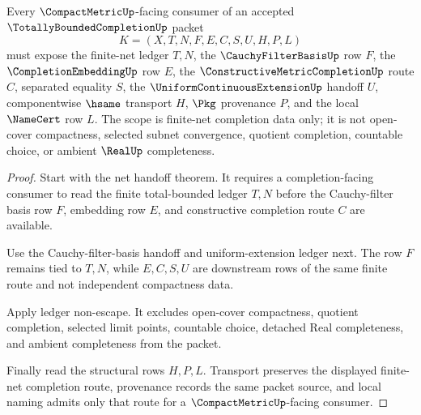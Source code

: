 \begin{theorem}
\label{thm:totally-bounded-completion-compact-metric-scope}
Every $\CompactMetricUp$-facing consumer of an accepted $\TotallyBoundedCompletionUp$ packet
$$
K=(X,T,N,F,E,C,S,U,H,P,L)
$$
must expose the finite-net ledger $T,N$, the $\CauchyFilterBasisUp$ row $F$, the $\CompletionEmbeddingUp$ row $E$, the $\ConstructiveMetricCompletionUp$ route $C$, separated equality $S$, the $\UniformContinuousExtensionUp$ handoff $U$, componentwise $\hsame$ transport $H$, $\Pkg$ provenance $P$, and the local $\NameCert$ row $L$. The scope is finite-net completion data only; it is not open-cover compactness, selected subnet convergence, quotient completion, countable choice, or ambient $\RealUp$ completeness.
\end{theorem}
\begin{proof}
Start with the net handoff theorem. It requires a completion-facing consumer to read the finite total-bounded ledger $T,N$ before the Cauchy-filter basis row $F$, embedding row $E$, and constructive completion route $C$ are available.

Use the Cauchy-filter-basis handoff and uniform-extension ledger next. The row $F$ remains tied to $T,N$, while $E,C,S,U$ are downstream rows of the same finite route and not independent compactness data.

Apply ledger non-escape. It excludes open-cover compactness, quotient completion, selected limit points, countable choice, detached Real completeness, and ambient completeness from the packet.

Finally read the structural rows $H,P,L$. Transport preserves the displayed finite-net completion route, provenance records the same packet source, and local naming admits only that route for a $\CompactMetricUp$-facing consumer.
\end{proof}

